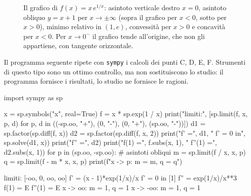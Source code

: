 \begin{figure}[htb]
\centering
{}
\caption{Il grafico di $f(x)=x\,e^{1/x}$: asintoto verticale destro $x=0$, asintoto
obliquo $y=x+1$ per $x\to\pm\infty$ (sopra il grafico per $x<0$, sotto per $x>0$),
minimo relativo in $(1,e)$, convessità per $x>0$ e concavità per $x<0$. Per
$x\to0^{-}$ il grafico tende all'origine, che non gli appartiene, con tangente
orizzontale.}
\label{fig:studio-xe1x}
\end{figure}

Il programma seguente ripete con \texttt{sympy} i calcoli dei punti C, D, E, F.
Strumenti di questo tipo sono un ottimo controllo, ma non sostituiscono lo studio: il
programma fornisce i risultati, lo studio ne fornisce le ragioni.

\begin{python}
import sympy as sp

x = sp.symbols("x", real=True)
f = x * sp.exp(1 / x)
print("limiti:", [sp.limit(f, x, p, d) for p, d in
                  ((-sp.oo, "+"), (0, "-"), (0, "+"), (sp.oo, "-"))])
d1 = sp.factor(sp.diff(f, x))
d2 = sp.factor(sp.diff(f, x, 2))
print("f'  =", d1, "   f' = 0 in", sp.solve(d1, x))
print("f'' =", d2)
print("f(1) =", f.subs(x, 1), "   f''(1) =", d2.subs(x, 1))
for p in (sp.oo, -sp.oo):                  # asintoti obliqui
    m = sp.limit(f / x, x, p)
    q = sp.limit(f - m * x, x, p)
    print(f"x -> {p}:  m = {m},  q = {q}")
\end{python}
\begin{risultato}
limiti: [-oo, 0, oo, oo]
f'  = (x - 1)*exp(1/x)/x    f' = 0 in [1]
f'' = exp(1/x)/x**3
f(1) = E    f''(1) = E
x -> oo:  m = 1,  q = 1
x -> -oo:  m = 1,  q = 1
\end{risultato}

